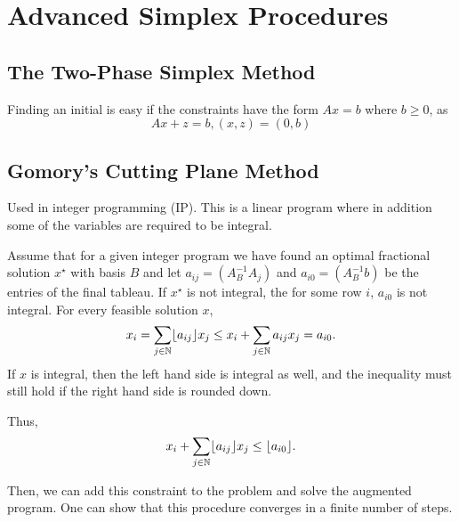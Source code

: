
\chapter{Advanced Simplex Procedures}
\label{cha:advanc-simpl-proc}

\section{The Two-Phase Simplex Method}
\label{sec:two-phase-simplex}

Finding an initial \bfs is easy if the constraints have the form $Ax =
b$ where $b \geq 0$, as
\begin{equation}
  \label{eq:22}
  Ax + z = b, (x, z) = (0, b)
\end{equation}

\section{Gomory's Cutting Plane Method}
\label{sec:gomorys-cutt-plane}

Used in integer programming (IP).  This is a linear program where in
addition some of the variables are required to be integral.

Assume that for a given integer program we have found an optimal
fractional solution $x^{\star}$ with basis $B$ and let $a_{ij} =
(A_{B}^{-1}A_{j})$ and $a_{i0} = (A_{B}^{-1}b)$ be the entries of the
final tableau.  If $x^{\star}$ is not integral, the for some row $i$,
$a_{i0}$ is not integral.  For every feasible solution $x$,
\begin{equation}
  \label{eq:25}
  x_{i} = \sum_{j \in \mathbb{N}} \lfloor a_{ij} \rfloor x_{j} \leq x_{i} +
  \sum_{j \in \mathbb{N}} a_{ij} x_{j} = a_{i0}.
\end{equation}  If $x$ is integral, then the left hand side is
integral as well, and the inequality must still hold if the right hand
side is rounded down.

Thus,
\begin{equation}
  \label{eq:26}
  x_{i} + \sum_{j \in \mathbb{N}} \lfloor a_{ij} \rfloor x_{j} \leq \lfloor a_{i0} \rfloor.
\end{equation}

Then, we can add this constraint to the problem and solve the
augmented program. One can show that this procedure converges in a
finite number of steps.

